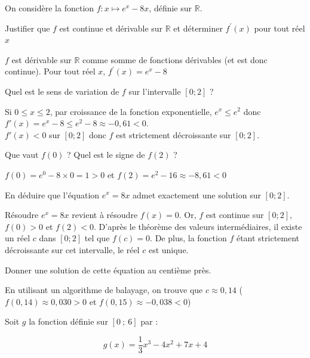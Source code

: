 \documentclass[11pt,a4paper]{article}  %
\begin{document}
On considère la fonction $f: x \mapsto e^x-8 x$, définie sur $\mathbb{R}$.
\begin{enumMet}
	\item Justifier que $f$ est continue et dérivable sur $\mathbb{R}$ et déterminer $f^{\prime}(x)$ pour tout réel $x$
	\begin{corrBox}
		$f$ est dérivable sur $\mathbb{R}$ comme somme de fonctions dérivables (et est donc continue). Pour tout réel $x$, $f^{\prime}(x)=e^x-8$
	\end{corrBox}
	\item Quel est le sens de variation de $f$ sur l'intervalle $[0 ; 2]$ ?
	\begin{corrBox}
		Si $0 \leqslant x \leqslant 2$, par croissance de la fonction exponentielle, $e^x \leqslant e^2$ donc $f'(x)=e^x-8\leqslant e^2-8\approx -0,61<0$.\\
		$f'(x)<0$ sur $[0 ; 2]$ donc $f$ est strictement décroissante sur $[0 ; 2]$.
	\end{corrBox}
	\item Que vaut $f(0)$ ? Quel est le signe de $f(2)$ ?
	\begin{corrBox}
		$f(0)=e^0-8\times 0=1>0$ et $f(2)=e^2-16\approx -8,61<0$
	\end{corrBox}
	\item En déduire que l'équation $e^x=8 x$ admet exactement une solution sur $[0 ; 2]$.
	\begin{corrBox}
		Résoudre $e^x=8x$ revient à résoudre $f(x)=0$. Or, $f$ est continue sur $[0 ; 2]$, $f(0)>0$ et $f(2)<0$. D'après le théorème des valeurs intermédiaires, il existe un réel $c$ dans $[0 ; 2]$ tel que $f(c)=0$. De plus, la fonction $f$ étant strictement décroissante sur cet intervalle, le réel $c$ est unique.
	\end{corrBox}
	\item Donner une solution de cette équation au centième près.
	\begin{corrBox}
		En utilisant un algorithme de balayage, on trouve que $c \approx 0,14$ \quad ($f(0,14)\approx 0,030>0$ et $f(0,15)\approx -0,038<0$)
	\end{corrBox}
\end{enumMet}


Soit $g$ la fonction définie sur $[0\ ;\ 6]$ par :

$$
g(x)=\frac{1}{3} x^3-4x^2+7x+4
$$
\end{document}
